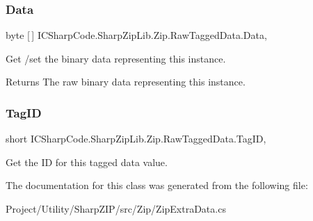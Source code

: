 \subsubsection{\texorpdfstring{Data}{Data}}
{\footnotesize\ttfamily byte \mbox{[}$\,$\mbox{]} I\+C\+Sharp\+Code.\+Sharp\+Zip\+Lib.\+Zip.\+Raw\+Tagged\+Data.\+Data\hspace{0.3cm}{\ttfamily [get]}, {\ttfamily [set]}}



Get /set the binary data representing this instance. 

\begin{DoxyReturn}{Returns}
The raw binary data representing this instance.
\end{DoxyReturn}
\mbox{\label{class_i_c_sharp_code_1_1_sharp_zip_lib_1_1_zip_1_1_raw_tagged_data_a15db758eb0959d9e00bea64693265d07}} 
\subsubsection{\texorpdfstring{Tag\+ID}{TagID}}
{\footnotesize\ttfamily short I\+C\+Sharp\+Code.\+Sharp\+Zip\+Lib.\+Zip.\+Raw\+Tagged\+Data.\+Tag\+ID\hspace{0.3cm}{\ttfamily [get]}, {\ttfamily [set]}}



Get the ID for this tagged data value. 



The documentation for this class was generated from the following file\+:\begin{DoxyCompactItemize}
\item 
Project/\+Utility/\+Sharp\+Z\+I\+P/src/\+Zip/Zip\+Extra\+Data.\+cs\end{DoxyCompactItemize}
